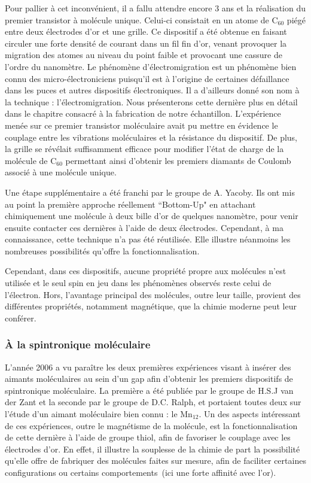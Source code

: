 Pour pallier à cet inconvénient, il a fallu attendre encore 3 ans et la réalisation du premier transistor à molécule unique. Celui-ci consistait en un atome de C$_{60}$ piégé entre deux électrodes d'or et une grille. Ce dispositif a été obtenue en faisant circuler une forte densité de courant dans un fil fin d'or, venant provoquer la migration des atomes au niveau du point faible et provocant une cassure de l'ordre du nanomètre. Le phénomène d'électromigration est un phénomène bien connu des micro-électroniciens puisqu'il est à l'origine de certaines défaillance dans les puces et autres dispositifs électroniques. Il a d'ailleurs donné son nom à la technique : l'électromigration. Nous présenterons cette dernière plus en détail dans le chapitre consacré à la fabrication de notre échantillon. L'expérience menée sur ce premier transistor moléculaire avait pu mettre en évidence le couplage entre les vibrations moléculaires et la résistance du dispositif. De plus, la grille se révélait suffisamment efficace pour modifier l'état de charge de la molécule de C$_{60}$ permettant ainsi d'obtenir les premiers diamants de Coulomb associé à une molécule unique.

Une étape supplémentaire a été franchi par le groupe de A. Yacoby. Ils ont mis au point la première approche réellement ``Bottom-Up" en attachant chimiquement une molécule à deux bille d'or de quelques nanomètre, pour venir ensuite contacter ces dernières à l'aide de deux électrodes. Cependant, à ma connaissance, cette technique n'a pas été réutilisée. Elle illustre néanmoins les nombreuses possibilités qu'offre la fonctionnalisation.

Cependant, dans ces dispositifs, aucune propriété propre aux molécules n'est utilisée et le seul spin en jeu dans les phénomènes observés reste celui de l'électron. Hors, l'avantage principal des molécules, outre leur taille, provient des différentes propriétés, notamment magnétique, que la chimie moderne peut leur conférer.

\subsubsection*{\`A la spintronique moléculaire}

L'année 2006 a vu paraître les deux premières expériences visant à insérer des aimants moléculaires au sein d'un gap afin d'obtenir les premiers dispositifs de spintronique moléculaire. La première a été publiée par le groupe de H.S.J van der Zant et la seconde par le groupe de D.C. Ralph, et portaient toutes deux sur l'étude d'un aimant moléculaire bien connu : le Mn$_{12}$. Un des aspects intéressant de ces expériences, outre le magnétisme de la molécule, est la fonctionnalisation de cette dernière à l'aide de groupe thiol, afin de favoriser le couplage avec les électrodes d'or. En effet, il illustre la souplesse de la chimie de part la possibilité qu'elle offre de fabriquer des molécules faites sur mesure, afin de faciliter certaines configurations ou certains comportements~(ici une forte affinité avec l'or).  

